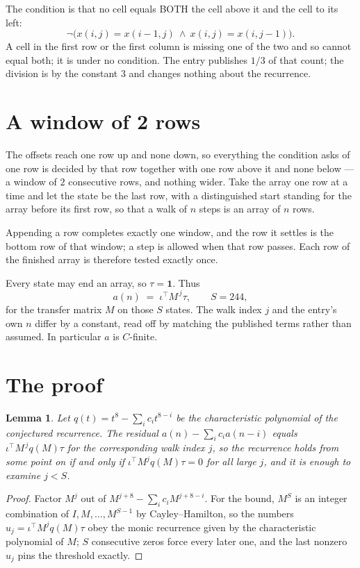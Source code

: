 \documentclass[11pt,a4paper]{article}
\theoremstyle{plain}
\newtheorem{lemma}[theorem]{Lemma}
\theoremstyle{definition}
\begin{document}
The condition is that no cell equals BOTH the cell above it and the cell to its left:
\[
\neg\bigl(x(i,j)=x(i-1,j)\ \wedge\ x(i,j)=x(i,j-1)\bigr).
\]
A cell in the first row or the first column is missing one of the two and so cannot equal both; it is under no condition. The entry publishes $1/3$ of that count; the division is by the constant 3 and changes nothing about the recurrence.

\section{A window of 2 rows}

The offsets reach one row up and none down, so everything the condition asks of one row is
decided by that row together with one row above it and none below --- a window of
$2$ consecutive rows, and nothing wider. Take the array one row at a time
and let the state be the last row, with a distinguished start standing for the
array before its first row, so that a walk of $n$ steps is an array of $n$ rows.

Appending a row completes exactly one window, and the row it settles is the bottom row of that window; a step is
allowed when that row passes. Each row of the finished
array is therefore tested exactly once.

Every state may end an array, so $\tau=\mathbf{1}$.
Thus
\[
a(n)\;=\;\iota^{\!\top}M^{\,j}\tau ,\qquad S=244,
\]
for the transfer matrix $M$ on those $S$ states. The walk index $j$ and the entry's own $n$
differ by a constant, read off by matching the published terms rather than assumed. In
particular $a$ is $C$-finite.

\section{The proof}

\begin{lemma}\label{lem:crit}
Let $q(t)=t^{8}-\sum_i c_it^{8-i}$ be the characteristic polynomial of the
conjectured recurrence. The residual $a(n)-\sum_ic_ia(n-i)$ equals
$\iota^{\!\top}M^{\,j}q(M)\tau$ for the corresponding walk index $j$, so the recurrence
holds from some point on if and only if $\iota^{\!\top}M^{j}q(M)\tau=0$ for all large $j$,
and it is enough to examine $j<S$.
\end{lemma}

\begin{proof}
Factor $M^{j}$ out of $M^{j+8}-\sum_ic_iM^{j+8-i}$. For the bound, $M^{S}$
is an integer combination of $I,M,\dots,M^{S-1}$ by Cayley--Hamilton, so the numbers
$u_j=\iota^{\!\top}M^{j}q(M)\tau$ obey the monic recurrence given by the characteristic
polynomial of $M$; $S$ consecutive zeros force every later one, and the last nonzero $u_j$
pins the threshold exactly.
\end{proof}
\end{document}

